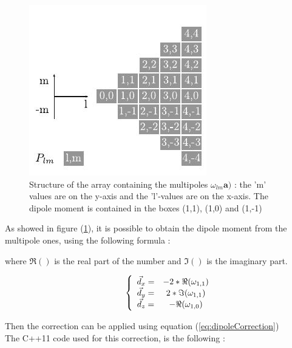 \documentclass[10pt,twoside,a4paper]{report}
\begin{document}
	\begin{figure}[H]
	\label{fig:triArray} 
	\includegraphics[scale=1]{triArray}
    \centering 
    \caption{Structure of the array containing the multipoles $\omega_{lm}\textbf{a})$ : the 'm' values are on the y-axis and the 'l'-values are on the x-axis. The dipole moment is contained in the boxes (1,1), (1,0) and (1,-1) }
   \label{fig:triArray}     
   \end{figure} 

As showed in figure (\ref{fig:triArray}), it is possible to obtain the dipole moment from the multipole ones, using the following formula :



where $\Re()$ is the real part of the number and $\Im()$ is the imaginary part.

\begin{equation}
\hspace{10 mm}
\left\lbrace
\begin{array}{ccc}
\vec{d}_x = & -2 * \Re(\omega_{1,1})\\
\vec{d}_y = &  2 * \Im(\omega_{1,1})\\
\vec{d}_z = & -\Re(\omega_{1,0})
\end{array}\right.
\end{equation}

Then the correction can be applied using equation (\ref{eq:dipoleCorrection})\\


The C++11 code used for this correction, is the following :
	
\end{document}
